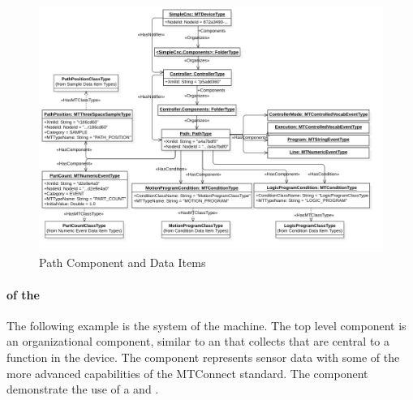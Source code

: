 \begin{figure}[ht]
    \centering
    \includegraphics[width=1.0\textwidth]{diagrams/mtconnect-mapping/path-component.png}
    \caption{Path Component and Data Items}
    \label{fig:path-component}
\end{figure}

\FloatBarrier

\paragraph{  of the }

The following example is the  system of the machine. The top level  component is an organizational component, similar to an  that collects  that are central to a function in the device. The  component represents sensor data with some of the more advanced capabilities of the MTConnect standard. The  component demonstrate the use of a  and .

